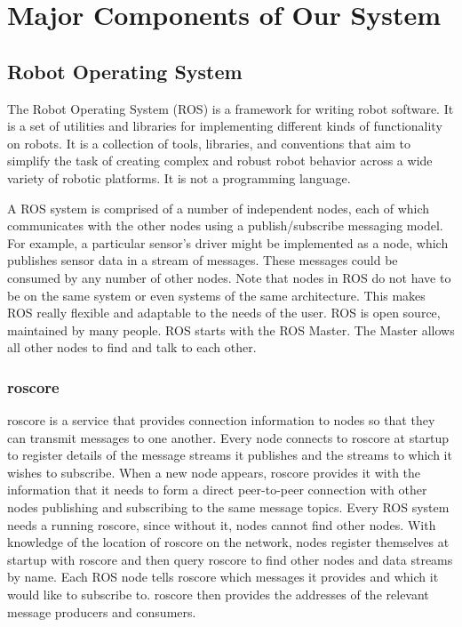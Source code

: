 \documentclass[journal]{IEEEtran}
\begin{document}
\section{Major Components of Our System}

\subsection{Robot Operating System}
The Robot Operating System (ROS) is a framework for writing robot software. It is a set of utilities and libraries for implementing different kinds of functionality on robots. It is a collection of tools, libraries, and conventions that aim to simplify the task of creating complex and robust robot behavior across a wide variety of robotic platforms. It is not a programming language. 

A ROS system is comprised of a number of independent nodes, each of which communicates with the other nodes using a publish/subscribe messaging model. For example, a particular sensor’s driver might be implemented as a node, which publishes sensor data in a stream of messages. These messages could be consumed by any number of other nodes.
Note that nodes in ROS do not have to be on the same system or even systems of the same architecture. This makes ROS really flexible and adaptable to the needs of the user. ROS is open source, maintained by many people.
ROS starts with the ROS Master. The Master allows all other nodes to find and talk to each other. 

\subsubsection{roscore}
roscore is a service that provides connection information to nodes so that they can
transmit messages to one another. Every node connects to roscore at startup to register
details of the message streams it publishes and the streams to which it wishes to subscribe.
When a new node appears, roscore provides it with the information that it needs to form a
direct peer-to-peer connection with other nodes publishing and subscribing to the same
message topics. Every ROS system needs a running roscore, since without it, nodes
cannot find other nodes.
With knowledge of the location of roscore on the network, nodes register themselves at
startup with roscore and then query roscore to find other nodes and data streams by
name. Each ROS node tells roscore which messages it provides and which it would like
to subscribe to. roscore then provides the addresses of the relevant message producers
and consumers.
\end{document}
